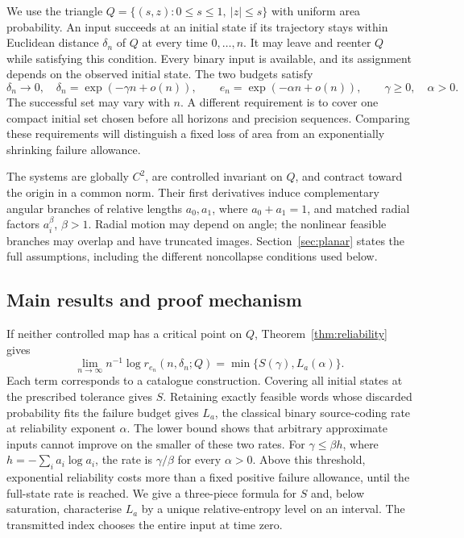 \documentclass[11pt]{amsart}
\theoremstyle{definition}
\theoremstyle{remark}
\numberwithin{equation}{section}
\begin{document}
We use the triangle
$Q=\{(s,z):0\le s\le1,\ |z|\le s\}$ with uniform area probability.
An input succeeds at an initial state if its trajectory stays within
Euclidean distance $\delta_n$ of $Q$ at every time $0,\ldots,n$.
It may leave and reenter $Q$ while satisfying this condition.
Every binary input is available, and its assignment depends on
the observed initial state. The two budgets satisfy
\[
\delta_n\to0,\quad \delta_n=\exp(-\gamma n+o(n)),\qquad
e_n=\exp(-\alpha n+o(n)),\qquad \gamma\ge0,\quad\alpha>0.
\]
The successful set may vary with $n$. A different requirement is
to cover one compact initial set chosen before all horizons and
precision sequences. Comparing these requirements will distinguish
a fixed loss of area from an exponentially shrinking failure allowance.

The systems are globally $C^2$, are controlled invariant on $Q$,
and contract toward the origin in a common norm. Their first
derivatives induce complementary angular branches of relative
lengths $a_0,a_1$, where $a_0+a_1=1$, and matched radial factors
$a_i^\beta$, $\beta>1$. Radial motion may depend on angle; the
nonlinear feasible branches may overlap and have truncated images.
Section~\ref{sec:planar} states the full assumptions, including
the different noncollapse conditions used below.

\subsection{Main results and proof mechanism}
If neither controlled map has a critical point on $Q$,
Theorem~\ref{thm:reliability} gives
\[
\lim_{n\to\infty}n^{-1}\log r_{e_n}(n,\delta_n;Q)
       =\min\{S(\gamma),L_a(\alpha)\}.
\]
Each term corresponds to a catalogue construction. Covering all
initial states at the prescribed tolerance gives $S$. Retaining
exactly feasible words whose discarded probability fits the failure
budget gives $L_a$, the classical binary source-coding rate at
reliability exponent $\alpha$. The lower bound shows that arbitrary
approximate inputs cannot improve on the smaller of these two rates.
For $\gamma\le\beta h$, where $h=-\sum_i a_i\log a_i$, the
rate is $\gamma/\beta$ for every $\alpha>0$. Above this threshold,
exponential reliability costs more than a fixed positive failure
allowance, until the full-state rate is reached. We give a three-piece
formula for $S$ and, below saturation, characterise $L_a$ by a unique
relative-entropy level on an interval. The transmitted index chooses
the entire input at time zero.
\end{document}
